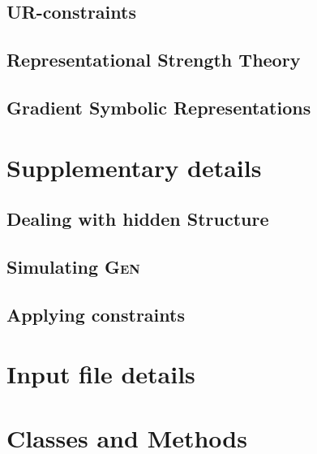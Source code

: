 \documentclass[12]{article}
\begin{document}
	\subsection{UR-constraints}

	\subsection{Representational Strength Theory}

	\subsection{Gradient Symbolic Representations}


\section{Supplementary details}
	\subsection{Dealing with hidden Structure}
	\subsection{Simulating \textsc{Gen}}
	\subsection{Applying constraints}

\section{Input file details}

\section{Classes and Methods}
\end{document}
